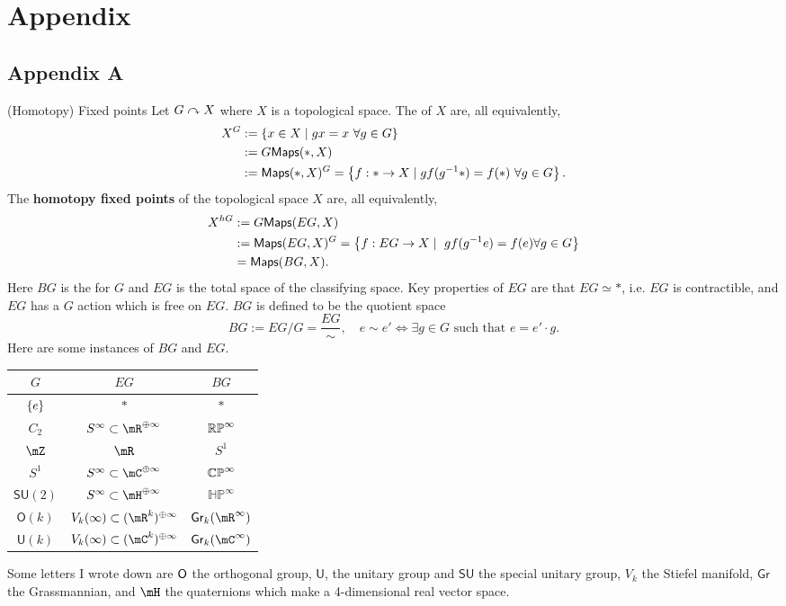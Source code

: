 \chapter{Appendix}
\newpage
\section{Appendix A}
\begin{definition}{(Homotopy) Fixed points}{}
    Let $G\curvearrowright X$ where $X$ is a topological space. The  of $X$ are, all equivalently, \begin{align*}
      X^G&:=\left\{ x\in X\mid gx = x~\forall g\in G \right\}\\
      &:=G\mathsf{Maps}(\ast,X)\\
      &:=\mathsf{Maps}(\ast,X)^G = \left\{ f:\ast\to X\mid gf(g^{-1} \ast) = f(\ast)~\forall g\in G \right\}.
    \end{align*}
    The \textbf{homotopy fixed points} of the topological space $X$ are, all equivalently, 
    \begin{align*}
      X^{hG}&:=G\mathsf{Maps}(EG,X)\\
      &:=\mathsf{Maps}(EG,X)^G = \left\{ f:EG\to X\mid ~gf(g^{-1} e) = f(e)\forall g\in G \right\}\\
      & = \mathsf{Maps}(BG,X).
    \end{align*}
    Here $BG$ is the  for $G$ and $EG$ is the total space of the classifying space. Key properties of $EG$ are that $EG\simeq \ast$, i.e. $EG$ is contractible, and $EG$ has a $G$ action which is free on $EG$. $BG$ is defined to be the quotient space $$BG:=EG/G = \frac{EG}{\sim},\quad e\sim e'\iff \exists g\in G\text{ such that }e = e'\cdot g.$$ Here are some instances of $BG$ and $EG$. 
    \begin{center}
      \begin{tabular}{c|c|c}
        $G$ & $EG$ & $BG$\\\hline
        $\left\{ e \right\}$ & $\ast$ & $\ast$ \\ 
        $C_2$  & $S^{\infty}\subset \mR^{\oplus \infty}$ & $\mathbb{RP}^\infty$ \\ 
        $\mZ$ & $\mR$ & $S^1$\\
        $S^1$ & $S^\infty \subset \mC^{\oplus \infty}$ & $\mathbb{CP}^\infty$\\
        $\mathsf{SU}(2)$ & $S^\infty\subset\mH^{\oplus \infty}$ & $\mathbb{HP}^\infty$\\
        $\mathsf{O}(k)$ & $V_k(\infty)\subset (\mR^k)^{\oplus \infty}$ & $\mathsf{Gr}_k(\mR^\infty)$\\
        $\mathsf{U}(k)$ & $V_k(\infty)\subset (\mC^k)^{\oplus \infty}$ & $\mathsf{Gr}_k(\mC^\infty)$
      \end{tabular}
    \end{center}
    Some letters I wrote down are $\mathsf{O}$ the orthogonal group, $\mathsf{U}$, the unitary group and $\mathsf{SU}$ the special unitary group, $V_k$ the Stiefel manifold, $\mathsf{Gr}$ the Grassmannian, and $\mH$ the quaternions which make a 4-dimensional real vector space. 
\end{definition}

